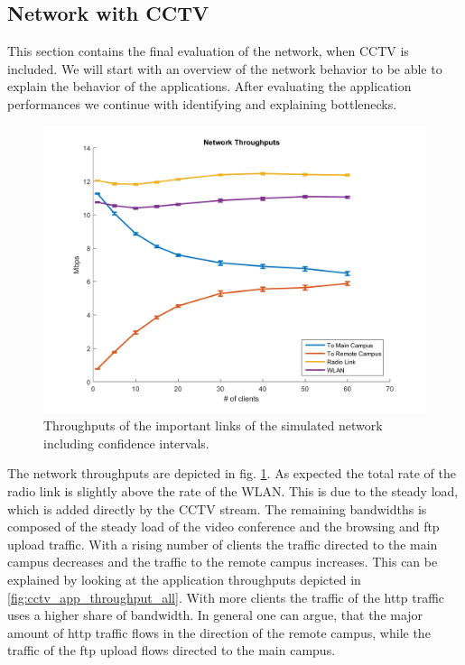 \documentclass[
10pt, %
a4paper, %
oneside, %
headinclude,footinclude, %
BCOR5mm, %
]{scrartcl}
\begin{document}
\subsection{Network with CCTV}
This section contains the final evaluation of the network, when CCTV is included. We will start with an overview of the network behavior to be able to explain the behavior of the applications. After evaluating the application performances we continue with identifying and explaining bottlenecks.
\begin{figure}[!ht]
  \centering
  \includegraphics[width=\textwidth]{Figures/cctv_network_throughputs.png}
  \caption{Throughputs of the important links of the simulated network including confidence intervals.} \label{fig:cctv_network_throughputs}
\end{figure}
The network throughputs are depicted in fig. \ref{fig:cctv_network_throughputs}. As expected the total rate of the radio link is slightly above the rate of the WLAN. This is due to the steady load, which is added directly by the CCTV stream. The remaining bandwidths is composed of the steady load of the video conference and the browsing and ftp upload traffic. With a rising number of clients the traffic directed to the main campus decreases and the traffic to the remote campus increases. This can be explained by looking at the application throughputs depicted in \ref{fig:cctv_app_throughput_all}. With more clients the traffic of the http traffic uses a higher share of bandwidth. In general one can argue, that the major amount of http traffic flows in the direction of the remote campus, while the traffic of the ftp upload flows directed to the main campus.
\end{document}
